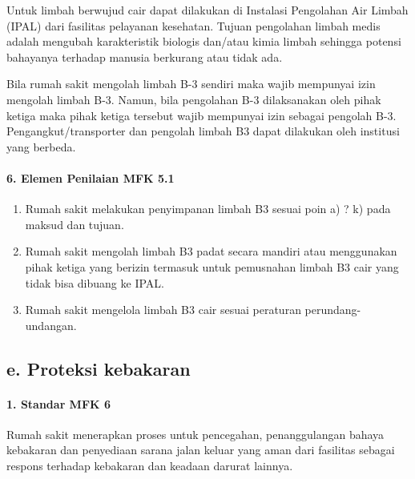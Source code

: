 \documentclass[
]{book}
\providecommand{\tightlist}{%
  \setlength{\itemsep}{0pt}\setlength{\parskip}{0pt}}
\begin{document}
Untuk limbah berwujud cair dapat dilakukan di Instalasi Pengolahan Air Limbah (IPAL) dari fasilitas pelayanan kesehatan.
Tujuan pengolahan limbah medis adalah mengubah karakteristik biologis dan/atau kimia limbah sehingga potensi bahayanya terhadap manusia berkurang atau tidak ada.

Bila rumah sakit mengolah limbah B-3 sendiri maka wajib mempunyai izin mengolah limbah B-3. Namun, bila pengolahan B-3 dilaksanakan oleh pihak ketiga maka pihak ketiga tersebut wajib mempunyai izin sebagai pengolah B-3. Pengangkut/transporter dan pengolah limbah B3 dapat dilakukan oleh institusi yang berbeda.

\hypertarget{elemen-penilaian-mfk-5.1}{%
\paragraph*{6. Elemen Penilaian MFK 5.1}\label{elemen-penilaian-mfk-5.1}}

\begin{enumerate}
\def\labelenumi{\alph{enumi}.}
\tightlist
\item
  Rumah sakit melakukan penyimpanan limbah B3 sesuai poin a) ? k) pada maksud dan tujuan.
\item
  Rumah sakit mengolah limbah B3 padat secara mandiri atau menggunakan pihak ketiga yang berizin termasuk untuk pemusnahan limbah B3 cair yang tidak bisa dibuang ke IPAL.
\item
  Rumah sakit mengelola limbah B3 cair sesuai peraturan perundang-undangan.
\end{enumerate}

\hypertarget{e.-proteksi-kebakaran}{%
\subsection*{e. Proteksi kebakaran}\label{e.-proteksi-kebakaran}}

\hypertarget{standar-mfk-6}{%
\paragraph*{1. Standar MFK 6}\label{standar-mfk-6}}

Rumah sakit menerapkan proses untuk pencegahan, penanggulangan bahaya kebakaran dan penyediaan sarana jalan keluar yang aman dari fasilitas sebagai respons terhadap kebakaran dan keadaan darurat lainnya.
\end{document}
